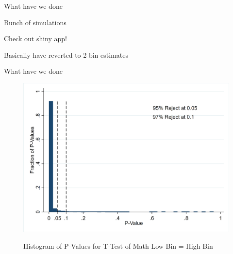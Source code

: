 \documentclass[t,aspectratio=169,11pt,presentation]{beamer}
\newenvironment{wideitemize}{\itemize\addtolength{\itemsep}{14pt}}{\enditemize}
\begin{document}
\begin{frame}{What have we done}
\begin{wideitemize}
    \item Bunch of simulations 
    \item Check out shiny app!
    \item Basically have reverted to 2 bin estimates 
\end{wideitemize}

\end{frame}

\begin{frame}{What have we done}
\begin{figure}[ht]
    \centering
    \caption{Histogram of P-Values for T-Test of Math Low Bin = High Bin}
    \includegraphics[width=.6\textwidth]{figures/Math_T_Test_Hist.png}
    \label{fig: math ttest}
\end{figure}

\end{frame}




\end{document}
